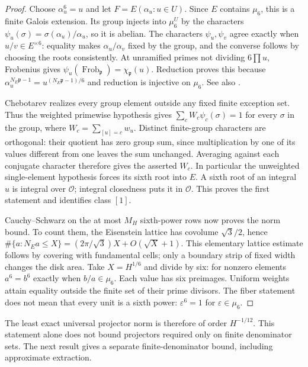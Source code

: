 \documentclass[11pt]{article}
\theoremstyle{remark}\newtheorem{remark}[theorem]{Remark}
\begin{document}
\begin{proof}
Choose $\alpha_u^6=u$ and let $F=E(\alpha_u:u\in U)$.
Since $E$ contains $\mu_6$, this is a finite Galois extension.
Its group injects into $\mu_6^U$ by the characters
$\psi_u(\sigma)=\sigma(\alpha_u)/\alpha_u$, so it is abelian.
The characters $\psi_u,\psi_v$ agree exactly when
$u/v\in E^{\times6}$: equality makes $\alpha_u/\alpha_v$
fixed by the group, and the converse follows by choosing the
roots consistently. At unramified primes not dividing
$6\prod u$, Frobenius gives
$\psi_u(\operatorname{Frob}_{\mathfrak p})
=\chi_{\mathfrak p}(u)$. Reduction proves this because
$\alpha_u^{N_E\mathfrak p-1}
=u^{(N_E\mathfrak p-1)/6}$ and reduction is injective on
$\mu_6$. See also \cite[VIII, \S\S5.2--5.3,
pp.~244--245]{Milne}.

Chebotarev \cite[V, Theorem 3.23, p.~164]{Milne}
realizes every group element outside any fixed finite
exception set. Thus the weighted primewise hypothesis gives
$\sum_c W_c\psi_c(\sigma)=1$ for every $\sigma$ in the group,
where $W_c=\sum_{[u]=c}w_u$.
Distinct finite-group characters are orthogonal: their
quotient has zero group sum, since multiplication by one
of its values different from one leaves the sum unchanged.
Averaging against each conjugate character therefore gives
the asserted $W_c$. In particular the unweighted
single-element hypothesis forces its sixth root into $E$.
A sixth root of an integral $u$ is integral over $\mathcal O$;
integral closedness puts it in $\mathcal O$.
This proves the first statement and identifies class $[1]$.

Cauchy--Schwarz on the at most $M_H$ sixth-power rows
now proves the norm bound. To count them, the Eisenstein
lattice has covolume $\sqrt3/2$, hence
$\#\{a:N_Ea\le X\}=(2\pi/\sqrt3)X+O(\sqrt X+1)$.
This elementary lattice estimate follows by covering with
fundamental cells; only a boundary strip of fixed width
changes the disk area. Take $X=H^{1/6}$ and divide by six:
for nonzero elements $a^6=b^6$ exactly when $b/a\in\mu_6$.
Each value has six preimages. Uniform weights attain equality
outside the finite set of their prime divisors.
The fiber statement does not mean that every unit is a
sixth power: $\varepsilon^6=1$ for $\varepsilon\in\mu_6$.
\end{proof}

The least exact universal projector norm is therefore of
order $H^{-1/12}$. This statement alone does not bound projectors
required only on finite denominator sets. The next result gives
a separate finite-denominator bound, including approximate extraction.
\end{document}
